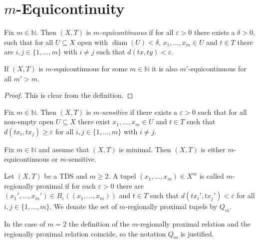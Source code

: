 \section{$m$-Equicontinuity}
\begin{definition}[$m$-Equicontinuity]
	Fix $m \in \mathbb{N}$. Then $(X, T)$ is \emph{$m$-equicontinuous} if for all $\varepsilon > 0$ there exists a $\delta > 0$, such that for all $U \subseteq X$ open with $\operatorname{diam}(U) < \delta$, $x_1, \dots, x_m \in U$ and $t \in T$ there are $i, j \in \{1, \dots, m\}$ with $i \neq j$ such that $d(tx, ty) < \varepsilon$.
\end{definition}

\begin{proposition}
	If $(X, T)$ is $m$-equicontinuous for some $m \in \mathbb{N}$ it is also $m'$-equicontinuous for all $m' > m$.
\end{proposition}
\begin{proof}
	This is clear from the definition.
\end{proof}

\begin{definition}[$m$-Sensitivity]
	Fix $m \in \mathbb{N}$. Then $(X, T)$ is \emph{$m$-sensitive} if there exists a $\varepsilon > 0$ such that for all non-empty open $U \subseteq X$ there exist $x_1, \dots, x_m \in U$ and $t \in T$ such that $d(tx_i, tx_j) \geq \varepsilon$ for all $i, j \in \{1, \dots, m\}$ with $i \neq j$.
\end{definition}

\begin{theorem}
	Fix $m \in \mathbb{N}$ and assume that $(X, T)$ is minimal. Then $(X, T)$ is either $m$-equicontinuous or $m$-sensitive.
\end{theorem}

\begin{definition}
	Let $(X, T)$ be a TDS and $m \geq 2$.
	A tupel $(x_1, \dots, x_m) \in X^m$ is called $m$-regionally proximal if for each $\varepsilon > 0$
	there are $(x_1', \dots, x_m') \in B_\varepsilon((x_1, \dots, x_m))$ and $t \in T$ such that $d(tx_i', tx_j') < \varepsilon$ for all $i, j \in \{1, \dots, m\}$.
	We denote the set of $m$-regionally proximal tupels by $Q_m$.
\end{definition}

\begin{remark}
	In the case of $m = 2$ the definition of the $m$-regionally proximal relation and the regionally proximal relation coincide,
	so the notation $Q_m$ is justified.
\end{remark}


